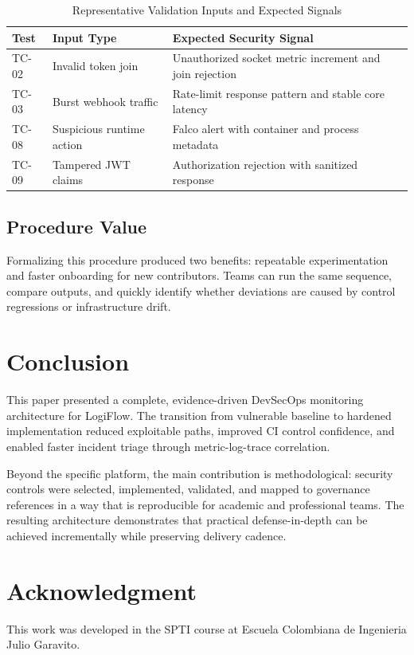 \documentclass[conference]{IEEEtran}
\begin{document}
\begin{table}[!t]
\caption{Representative Validation Inputs and Expected Signals}
\centering
\footnotesize
\begin{tabularx}{\linewidth}{>{\raggedright\arraybackslash}p{0.9cm} >{\raggedright\arraybackslash}p{1.05cm} Y}
\toprule
Test & Input Type & Expected Security Signal \\
\midrule
TC-02 & Invalid token join & Unauthorized socket metric increment and join rejection \\
TC-03 & Burst webhook traffic & Rate-limit response pattern and stable core latency \\
TC-08 & Suspicious runtime action & Falco alert with container and process metadata \\
TC-09 & Tampered JWT claims & Authorization rejection with sanitized response \\
\bottomrule
\end{tabularx}
\label{tab:validationinputs}
\end{table}

\subsection{Procedure Value}
Formalizing this procedure produced two benefits: repeatable experimentation and faster onboarding for new contributors. Teams can run the same sequence, compare outputs, and quickly identify whether deviations are caused by control regressions or infrastructure drift.

\section{Conclusion}
This paper presented a complete, evidence-driven DevSecOps monitoring architecture for LogiFlow. The transition from vulnerable baseline to hardened implementation reduced exploitable paths, improved CI control confidence, and enabled faster incident triage through metric-log-trace correlation.

Beyond the specific platform, the main contribution is methodological: security controls were selected, implemented, validated, and mapped to governance references in a way that is reproducible for academic and professional teams. The resulting architecture demonstrates that practical defense-in-depth can be achieved incrementally while preserving delivery cadence.

\section*{Acknowledgment}
This work was developed in the SPTI course at Escuela Colombiana de Ingenieria Julio Garavito.



\end{document}
